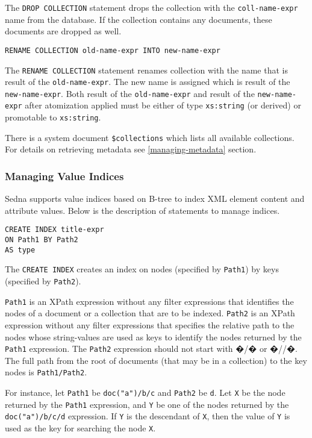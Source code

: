 \documentclass[a4paper,12pt]{article}
\begin{document}
The \verb!DROP COLLECTION! statement drops the collection with the
\verb!coll-name-expr! name from the database.
If the collection contains any documents, these documents are dropped as well.

\begin{verbatim}
RENAME COLLECTION old-name-expr INTO new-name-expr
\end{verbatim}

The \verb!RENAME COLLECTION! statement renames collection with the name that is result of the \verb!old-name-expr!.
The new name is assigned which is result of the \verb!new-name-expr!.
Both result of the \verb!old-name-expr! and result of the \verb!new-name-expr! after atomization applied must be either
of type \verb!xs:string! (or derived) or promotable to \verb!xs:string!.

\hbox{}

There is a system document \verb!$collections! which lists all available collections. For details on retrieving metadata see \ref{managing-metadata} section.

\subsubsection{Managing Value Indices}
\label{sec:managing-value-indices}
Sedna supports value indices based on B-tree to index XML element content and attribute values. Below is the description of statements to manage indices.

\begin{verbatim}
CREATE INDEX title-expr
ON Path1 BY Path2
AS type
\end{verbatim}

The \verb!CREATE INDEX! creates an index on nodes (specified by \verb!Path1!) by keys (specified by \verb!Path2!).

\verb!Path1! is an XPath expression without any filter expressions that identifies the nodes of a document or a collection that are to be indexed. \verb!Path2! is an XPath expression without any filter expressions that specifies the relative path to the nodes  whose string-values are used as keys to identify the nodes returned by the \verb!Path1! expression. The \verb!Path2! expression should not start with �/� or �//�. The full path from the root of documents (that may be in a collection) to the key nodes is \verb!Path1/Path2!.

For instance, let \verb!Path1! be \verb!doc("a")/b/c! and \verb!Path2! be \verb!d!. Let \verb!X! be  the node returned by the \verb!Path1! expression, and \verb!Y! be one of the nodes returned by the \verb!doc("a")/b/c/d! expression. If \verb!Y! is the descendant of \verb!X!, then the value of \verb!Y! is used as the key for searching the node \verb!X!.
\end{document}
